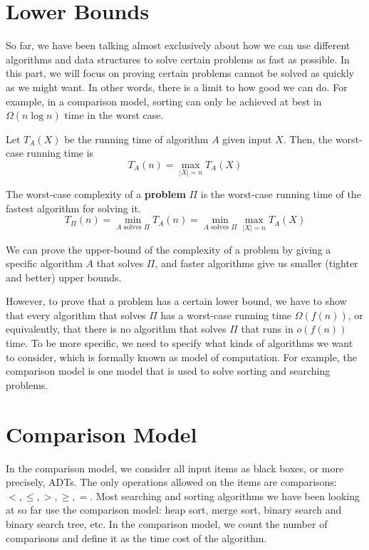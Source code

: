 \section{Lower Bounds}   

So far, we have been talking almost exclusively about how we can use different algorithms and data structures to solve certain problems as fast as possible. In this part, we will focus on proving certain problems cannot be solved as quickly as we might want. In other words, there is a limit to how good we can do. For example, in a comparison model, sorting can only be achieved at best in $\Omega(n \log n)$ time in the worst case.

Let $T_A(X)$ be the running time of algorithm $A$ given input $X$. Then, the worst-case running time is
$$
T_A(n) = \max_{|X|=n} T_A(X)
$$

The worst-case complexity of a \textbf{problem} $\Pi$ is the worst-case running time of the fastest algorithm for solving it. 
$$
T_{\Pi}(n) = \min_{\text{$A$ solves $\Pi$}} T_A(n) = \min_{\text{$A$ solves $\Pi$}} \max_{|X|=n}T_A(X)
$$

We can prove the upper-bound of the complexity of a problem by giving a specific algorithm $A$ that solves $\Pi$, and faster algorithms give us smaller (tighter and better) upper bounds.

However, to prove that a problem has a certain lower bound, we have to show that every algorithm that solves $\Pi$ has a worst-case running time $\Omega(f(n))$, or equivalently, that there is no algorithm that solves $\Pi$ that runs in $o(f(n))$ time. To be more specific, we need to specify what kinds of algorithms we want to consider, which is formally known as model of computation. For example, the comparison model is one model that is used to solve sorting and searching problems.

\section{Comparison Model}

In the comparison model, we consider all input items as black boxes, or more precisely, ADTs. The only operations allowed on the items are comparisons: $<, \leq, >, \geq, =$. Most searching and sorting algorithms we have been looking at so far use the comparison model: heap sort, merge sort, binary search and binary search tree, etc. In the comparison model, we count the number of comparisons and define it as the time cost of the algorithm.


